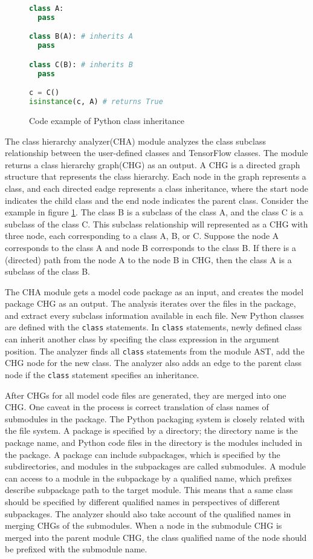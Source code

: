 \begin{figure}[h]
\begin{lstlisting}[language=Python]
class A:
  pass

class B(A): # inherits A
  pass

class C(B): # inherits B
  pass

c = C()
isinstance(c, A) # returns True
\end{lstlisting}
\caption{Code example of Python class inheritance}
\label{fig:cha:pythonex}
\end{figure}

The class hierarchy analyzer(CHA) module analyzes the
class subclass relationship between the 
user-defined classes and TensorFlow classes.
The module returns a class hierarchy graph(CHG) as an output.
A CHG is a directed graph structure that represents the class hierarchy.
Each node in the graph represents a class,
and each directed eadge represents a class inheritance,
where the start node indicates the child class
and the end node indicates the parent class.
Consider the example in figure \ref{fig:cha:pythonex}.
The class B is a subclass of the class A, and the class C is a subclass of the
class C.
This subclass relationship will represented as a CHG with three node,
each corresponding to a class A, B, or C.
Suppose the node A corresponds to the class A and node B corresponds to
the class B.
If there is a (directed) path from the node A to the node B in CHG,
then the class A is a subclass of the class B.

The CHA module gets a model code package as an input,
and creates the model package CHG as an output.
The analysis iterates over the files in the package,
and extract every subclass information available in each file.
New Python classes are defined with the {\tt class} statements.
In {\tt class} statements, newly defined class can
inherit another class by specifing the class expression
in the argument position.
The analyzer finds all {\tt class} statements from the module AST,
add the CHG node for the new class. The analyzer also adds an edge
to the parent class node if the {\tt class} statement specifies an inheritance.

After CHGs for all model code files are generated, 
they are merged into one CHG.
One caveat in the process is correct translation of class names
of submodules in the package.
The Python packaging system is closely related with the file system.
A package is specified by a directory; 
the directory name is the package name, 
and Python code files in the directory is the modules included in the package.
A package can include subpackages, which is specified
by the subdirectories, and modules in the subpackages are called submodules.
A module can access to a module in the subpackage by a qualified name,
which prefixes describe subpackage path to the target module.
This means that a same class should be specified by different qualified
names in perspectives of different subpackages.
The analyzer should also take account of the qualified names
in merging CHGs of the submodules. 
When a node in the submodule CHG is merged into the parent module CHG,
the class qualified name of the node should be prefixed with the
submodule name.

